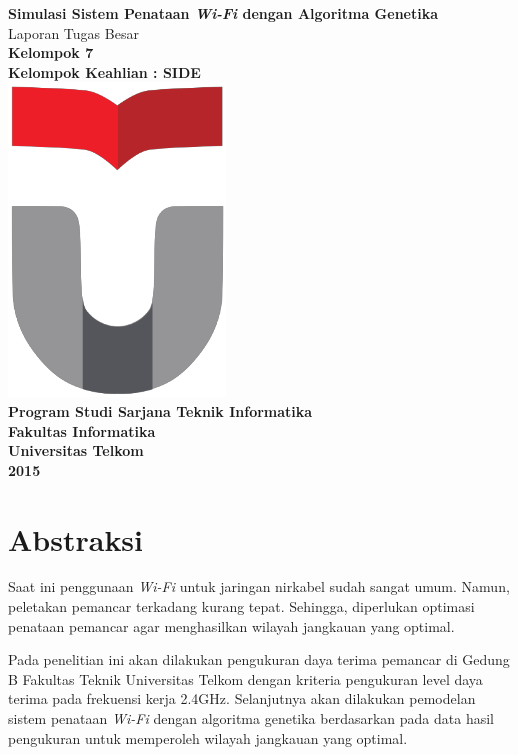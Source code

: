 \documentclass[12pt,a4paper,oneside,titlepage]{report}
\begin{document}
		\begingroup
		\thispagestyle{empty}  
		\begin{center}
			\LARGE{\textbf{Simulasi Sistem Penataan \emph{Wi-Fi} dengan Algoritma Genetika}}\\[0.5cm]
			\large{Laporan Tugas Besar}\\[1cm]
			\textbf{Kelompok 7\\
			Kelompok Keahlian : SIDE}\\[2cm]
			\includegraphics[width=0.3\linewidth]{logo}\\[2cm]
			\textbf{Program Studi Sarjana Teknik Informatika\\
			Fakultas Informatika\\
			Universitas Telkom\\
			2015}
		\end{center}
		\endgroup
		\newpage
		
		\setcounter{page}{1}
		\chapter*{Abstraksi}
			Saat ini penggunaan \emph{Wi-Fi} untuk jaringan nirkabel sudah sangat umum. Namun, peletakan pemancar terkadang kurang tepat. Sehingga, diperlukan optimasi penataan pemancar agar menghasilkan wilayah jangkauan yang optimal.
			
			Pada penelitian ini akan dilakukan pengukuran daya terima pemancar di Gedung B Fakultas Teknik Universitas Telkom dengan kriteria pengukuran level daya terima pada frekuensi kerja 2.4GHz. Selanjutnya akan dilakukan pemodelan sistem penataan \emph{Wi-Fi} dengan algoritma genetika berdasarkan pada data hasil pengukuran untuk memperoleh wilayah jangkauan yang optimal.
		
\end{document}

